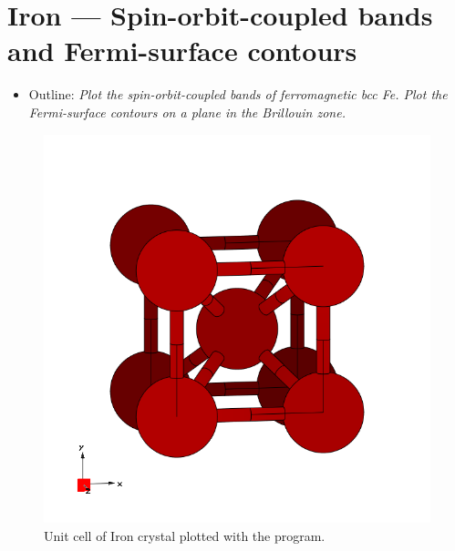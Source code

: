 \section{Iron --- Spin-orbit-coupled bands and Fermi-surface contours}
\label{sec17:IronSO}

\begin{itemize}
	\item Outline: {\it Plot the spin-orbit-coupled bands of ferromagnetic bcc Fe. Plot the Fermi-surface contours on a plane in the Brillouin zone.}
\end{itemize}

\begin{figure}[h!]
\centering
\includegraphics[width=0.25\columnwidth,trim={45pt 45pt 55pt 55pt},clip]{figure/example08/iron.png}
\caption{Unit cell of Iron crystal plotted with the \xcrysden{} program.}
\label{fig17.0}
\end{figure}


